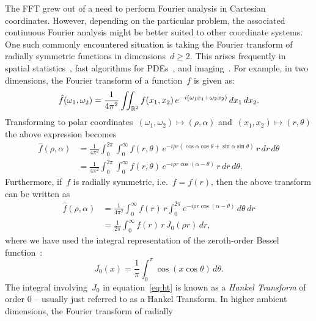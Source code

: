 The FFT grew out of a need to perform Fourier analysis in Cartesian coordinates.
However, depending on the particular problem, the associated continuous Fourier
analysis might be better suited to other coordinate systems. One such commonly
encountered situation is taking the Fourier transform of radially symmetric
functions in dimensions~$ d \geq 2$. This arises frequently in spatial
statistics~\cite{}, fast algorithms for PDEs~\cite{}, and imaging~\cite{}. For
example, in two dimensions, the Fourier transform of a function~$f$ is given as:
\begin{equation}
  \hat{f}(\omega_1, \omega_2) = \frac{1}{4\pi^2} \iint_{\mathbb{R}^2} f(x_1, x_2) \, e^{-i(\omega_1 x_1 + \omega_2 x_2)}  \, dx_1 \, dx_2.
\end{equation}
Transforming to polar coordinates~$(\omega_1,\omega_2) \mapsto (\rho,\alpha)$
and~$(x_1,x_2) \mapsto (r,\theta)$ the above expression becomes
\begin{equation}
  \label{eq:ftpolar}
  \begin{aligned}
    \hat{f}(\rho, \alpha) &= \frac{1}{4\pi^2} \int_0^{2\pi} \int_0^\infty
    f(r,\theta) \, 
    e^{-i \rho r (\cos\alpha \cos\theta + \sin\alpha \sin\theta) } 
    \, r \, dr \, d\theta \\
  &= \frac{1}{4\pi^2} \int_0^{2\pi} \int_0^\infty f(r,\theta) \, e^{-i \rho r \cos(\alpha-\theta) } \, r \, dr \, d\theta.
  \end{aligned}
\end{equation}
Furthermore, if~$f$ is radially symmetric, i.e.~$f = f(r)$, then the above
transform can be written as
\begin{equation}
  \label{eq:ht}
  \begin{aligned}
  \hat{f}(\rho,\alpha) &= \frac{1}{4\pi^2} \int_0^\infty f(r) \, r \int_0^{2\pi} 
  e^{-i \rho r \cos(\alpha - \theta) }  \, d\theta \, dr \\
  &= \frac{1}{2\pi} \int_0^\infty f(r) \, r \, J_0(\rho r)  \, dr,
  \end{aligned}
\end{equation}
where we have used the integral representation of the zeroth-order Bessel
function~\cite{olver2010nist}:
\begin{equation}
  J_0(x) = \frac{1}{\pi} \int_0^\pi \cos \left( x \cos \theta \right) \, d\theta.
\end{equation}
The integral involving~$J_0$ in equation~\eqref{eq:ht} is known as a
\emph{Hankel Transform} of order 0 -- usually just referred to as a Hankel
Transform. In higher ambient dimensions, the Fourier transform of radially
